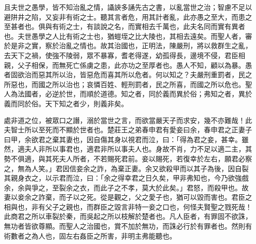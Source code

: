 \begin{pinyinscope}
且夫世之愚學，皆不知治亂之情，讘䛟多誦先古之書，以亂當世之治；智慮不足以避阱井之陷，又妄非有術之士。聽其言者危，用其計者亂，此亦愚之至大，而患之至甚者也。俱與有術之士，有談說之名，而實相去千萬也，此夫名同而實有異者也。夫世愚學之人比有術之士也，猶螘垤之比大陵也，其相去遠矣。而聖人者，審於是非之實，察於治亂之情也。故其治國也，正明法，陳嚴刑，將以救群生之亂，去天下之禍，使強不陵弱，眾不暴寡，耆老得遂，幼孤得長，邊境不侵，君臣相親，父子相保，而無死亡係虜之患，此亦功之至厚者也。愚人不知，顧以為暴。愚者固欲治而惡其所以治，皆惡危而喜其所以危者。何以知之？夫嚴刑重罰者，民之所惡也，而國之所以治也；哀憐百姓、輕刑罰者，民之所喜，而國之所以危也。聖人為法國者，必逆於世，而順於道德。知之者，同於義而異於俗；弗知之者，異於義而同於俗。天下知之者少，則義非矣。

處非道之位，被眾口之譖，溺於當世之言，而欲當嚴天子而求安，幾不亦難哉！此夫智士所以至死而不顯於世者也。楚莊王之弟春申君有愛妾曰余，春申君之正妻子曰甲，余欲君之棄其妻也，因自傷其身以視君而泣，曰：「得為君之妾，甚幸。雖然，適夫人非所以事君也，適君非所以事夫人也。身故不肖，力不足以適二主，其勢不俱適，與其死夫人所者，不若賜死君前。妾以賜死，若復幸於左右，願君必察之，無為人笑。」君因信妾余之詐，為棄正妻。余又欲殺甲而以其子為後，因自裂其親身衣之，以示君而泣，曰：「余之得幸君之日久矣，甲非弗知也，今乃欲強戲余，余與爭之，至裂余之衣，而此子之不孝，莫大於此矣。」君怒，而殺甲也。故妻以妾余之詐棄，而子以之死。從是觀之，父之愛子也，猶可以毀而害也。君臣之相與也，非有父子之親也，而群臣之毀言非特一妾之口也，何怪夫賢聖之戮死哉！此商君之所以車裂於秦，而吳起之所以枝解於楚者也。凡人臣者，有罪固不欲誅，無功者皆欲尊顯。而聖人之治國也，賞不加於無功，而誅必行於有罪者也。然則有術數者之為人也，固左右姦臣之所害，非明主弗能聽也。


\end{pinyinscope}
